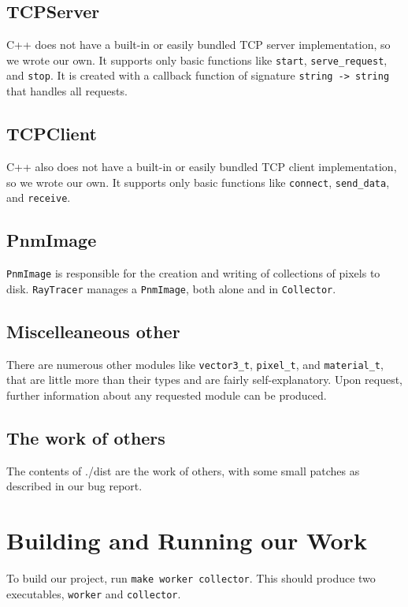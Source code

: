 \documentclass[letterpaper,twocolumn,10pt]{article}
\begin{document}
\subsection{TCPServer}

C++ does not have a built-in or easily bundled TCP server implementation, so we
wrote our own. It supports only basic functions like \verb|start|,
\verb|serve_request|, and \verb|stop|. It is created with a callback function of
signature \verb|string -> string| that handles all requests.

\subsection{TCPClient}

C++ also does not have a built-in or easily bundled TCP client implementation,
so we wrote our own. It supports only basic functions like \verb|connect|,
\verb|send_data|, and \verb|receive|.

\subsection{PnmImage}

\verb|PnmImage| is responsible for the creation and writing of collections of
pixels to disk. \verb|RayTracer| manages a \verb|PnmImage|, both alone and in
\verb|Collector|.

\subsection{Miscelleaneous other}

There are numerous other modules like \verb|vector3_t|, \verb|pixel_t|, and
\verb|material_t|, that are little more than their types and are fairly
self-explanatory. Upon request, further information about any requested module
can be produced.

\subsection{The work of others}
The contents of ./dist are the work of others, with some small patches as
described in our bug report. 

\section{Building and Running our Work}

To build our project, run \verb|make worker collector|. This should
produce two executables, \verb|worker| and \verb|collector|. 
\end{document}
